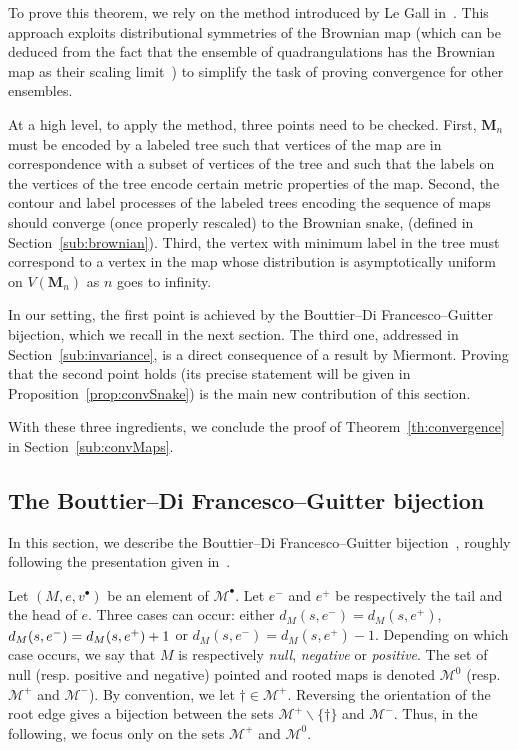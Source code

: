 \documentclass[10pt]{amsart}
\theoremstyle{definition}\newtheorem{defi}[theo]{Definition}\newtheorem{rema}[theo]{Remark}\newtheorem{exam}[theo]{Example}\newtheorem{exem}[theo]{Example}\newtheorem{nota}[theo]{Notation}
\newcommand{\cM}{\mathcal{M}}
\newcommand{\bM}{\mathbf{M}}
\newcommand{\sbt}{{\ensuremath{\scriptscriptstyle\bullet}}}
\begin{document}
To prove this theorem, we rely on the method introduced by Le Gall in~\cite[Section~8]{LeGallUniqueness}. This approach exploits distributional symmetries of the Brownian map (which can be deduced from the fact that the ensemble of quadrangulations has the Brownian map as their scaling limit~\cite{LeGallUniqueness,MiermontBrownian}) to simplify the task of proving convergence for other ensembles.

At a high level, to apply the method, three points need to be checked. First, $\bM_n$ must be encoded by a labeled tree such that vertices of the map are in correspondence with a subset of vertices of the tree and such that the labels on the vertices of the tree encode certain metric properties of the map. Second, the contour and label processes of the labeled trees encoding the sequence of maps should converge (once properly rescaled) to the Brownian snake, (defined in Section~\ref{sub:brownian}). Third, the vertex with minimum label in the tree must correspond to a vertex in the map whose distribution is asymptotically uniform on $V(\bM_n)$ as $n$ goes to infinity.

In our setting, the first point is achieved by the Bouttier--Di Francesco--Guitter bijection, which we recall in the next section. The third one, addressed in Section~\ref{sub:invariance}, is a direct consequence of a result by Miermont. Proving that the second point holds (its precise statement will be given in Proposition~\ref{prop:convSnake}) is the main new contribution of this section.

With these three ingredients, we conclude the proof of Theorem~\ref{th:convergence} in Section~\ref{sub:convMaps}.


\subsection{The Bouttier--Di Francesco--Guitter bijection}\label{sub:BDG}
In this section, we describe the Bouttier--Di Francesco--Guitter bijection~\cite{BDG2004}, roughly following the presentation given in~\cite{CurienLeGallMiermontCactus}.

Let $(M,e,v^\sbt)$ be an element of $\cM^\bullet$. Let $e^-$ and $e^+$ be respectively the tail and the head of $e$. Three cases can occur: either $d_M(s,e^-)=d_M(s,e^+)$, $d_M(s,e^-)\linebreak=d_M(s,e^+)+1$ or $d_M(s,e^-)=d_M(s,e^+)-1$. Depending on which case occurs, we say that $M$ is respectively \emph{null}, \emph{negative} or \emph{positive}. The set of null (resp. positive and negative) pointed and rooted maps is denoted $\cM^0$ (resp. $\cM^+$ and $\cM^-$). By convention, we let $\dagger \in \cM^+$. Reversing the orientation of the root edge gives a bijection between the sets $\cM^+\backslash\{\dagger\}$ and $\cM^-$. Thus, in the following, we focus only on the sets $\cM^+$ and $\cM^0$.
\end{document}
